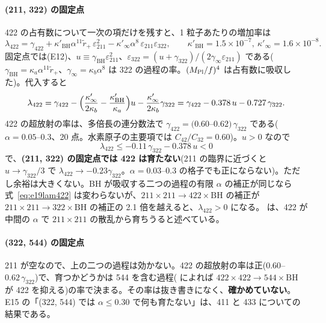 \paragraph{(211, 322) の固定点}
422 の占有数について一次の項だけを残すと、1 粒子あたりの増加率は
\begin{equation}
\lambda_{422}=\gamma_{422}+\kappa'_\mathrm{BH}\alpha^{11}\tilde r_+\,\varepsilon_{211}^2-\kappa'_\infty\alpha^8\,\varepsilon_{211}\varepsilon_{322},
\qquad\kappa'_\mathrm{BH}=1.5\times10^{-7},\ \kappa'_\infty=1.6\times10^{-8}.
\end{equation}
固定点では(E12)、$u\equiv\gamma_\mathrm{BH}\varepsilon_{211}^2$、$\varepsilon_{322}=(u+\gamma_{322})/(2\gamma_\infty\varepsilon_{211})$ である($\gamma_\mathrm{BH}=\kappa_a\alpha^{11}\tilde r_+$、$\gamma_\infty=\kappa_b\alpha^8$ は 322 の過程の率。$(M_\mathrm{Pl}/f)^4$ は占有数に吸収した)。代入すると
\begin{equation}
\lambda_{422}=\gamma_{422}-\Bigl(\frac{\kappa'_\infty}{2\kappa_b}-\frac{\kappa'_\mathrm{BH}}{\kappa_a}\Bigr)u-\frac{\kappa'_\infty}{2\kappa_b}\gamma_{322}
=\gamma_{422}-0.378\,u-0.727\,\gamma_{322}.
\label{eq:e19lam422}
\end{equation}
422 の超放射の率は、多倍長の連分数法で $\gamma_{422}=(0.60$--$0.62)\,\gamma_{322}$ である($\alpha=0.05$--0.3、20 点。水素原子の主要項では $C_{42}/C_{32}=0.60$)。$u>0$ なので
\begin{equation}
\lambda_{422}\le-0.11\,\gamma_{322}-0.378\,u<0
\end{equation}
で、\textbf{(211, 322) の固定点では 422 は育たない}(211 の臨界に近づくと $u\to\gamma_{322}/3$ で $\lambda_{422}\to-0.23\gamma_{322}$。$\alpha=0.03$--0.3 の格子でも正にならない)。ただし余裕は大きくない。BH が吸収する二つの過程の有限 $\alpha$ の補正が同じなら式~\eqref{eq:e19lam422} は変わらないが、$211\times211\to422\times\mathrm{BH}$ の補正が $211\times211\to322\times\mathrm{BH}$ の補正の 2.1 倍を越えると、$\lambda_{422}>0$ になる。 は、422 が中間の $\alpha$ で $211\times211$ の散乱から育ちうると述べている。

\paragraph{(322, 544) の固定点}
211 が空なので、上の二つの過程は効かない。422 の超放射の率は正($0.60$--$0.62\,\gamma_{322}$)で、育つかどうかは 544 を含む過程( によれば $422\times422\to544\times\mathrm{BH}$ が 422 を抑える)の率で決まる。その率は抜き書きになく、\textbf{確かめていない}。E15 の「(322, 544) では $\alpha\le0.30$ で何も育たない」は、411 と 433 についての結果である。

